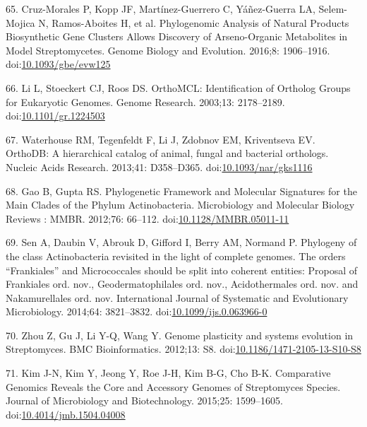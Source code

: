 \documentclass[12pt,twoside]{reedthesis}
\begin{document}
  \hypertarget{ref-cruz-moralesux5fphylogenomicux5f2016}{}
  65. Cruz-Morales P, Kopp JF, Martínez-Guerrero C, Yáñez-Guerra LA,
  Selem-Mojica N, Ramos-Aboites H, et al. Phylogenomic Analysis of Natural
  Products Biosynthetic Gene Clusters Allows Discovery of Arseno-Organic
  Metabolites in Model Streptomycetes. Genome Biology and Evolution.
  2016;8: 1906--1916.
  doi:\href{https://doi.org/10.1093/gbe/evw125}{10.1093/gbe/evw125}
  
  \hypertarget{ref-liux5forthomclux5f2003}{}
  66. Li L, Stoeckert CJ, Roos DS. OrthoMCL: Identification of Ortholog
  Groups for Eukaryotic Genomes. Genome Research. 2003;13: 2178--2189.
  doi:\href{https://doi.org/10.1101/gr.1224503}{10.1101/gr.1224503}
  
  \hypertarget{ref-waterhouseux5forthodbux5f2013}{}
  67. Waterhouse RM, Tegenfeldt F, Li J, Zdobnov EM, Kriventseva EV.
  OrthoDB: A hierarchical catalog of animal, fungal and bacterial
  orthologs. Nucleic Acids Research. 2013;41: D358--D365.
  doi:\href{https://doi.org/10.1093/nar/gks1116}{10.1093/nar/gks1116}
  
  \hypertarget{ref-gaoux5fphylogeneticux5f2012}{}
  68. Gao B, Gupta RS. Phylogenetic Framework and Molecular Signatures for
  the Main Clades of the Phylum Actinobacteria. Microbiology and Molecular
  Biology Reviews : MMBR. 2012;76: 66--112.
  doi:\href{https://doi.org/10.1128/MMBR.05011-11}{10.1128/MMBR.05011-11}
  
  \hypertarget{ref-senux5fphylogenyux5f2014}{}
  69. Sen A, Daubin V, Abrouk D, Gifford I, Berry AM, Normand P. Phylogeny
  of the class Actinobacteria revisited in the light of complete genomes.
  The orders ``Frankiales'' and Micrococcales should be split into
  coherent entities: Proposal of Frankiales ord. nov., Geodermatophilales
  ord. nov., Acidothermales ord. nov. and Nakamurellales ord. nov.
  International Journal of Systematic and Evolutionary Microbiology.
  2014;64: 3821--3832.
  doi:\href{https://doi.org/10.1099/ijs.0.063966-0}{10.1099/ijs.0.063966-0}
  
  \hypertarget{ref-zhouux5fgenomeux5f2012}{}
  70. Zhou Z, Gu J, Li Y-Q, Wang Y. Genome plasticity and systems
  evolution in Streptomyces. BMC Bioinformatics. 2012;13: S8.
  doi:\href{https://doi.org/10.1186/1471-2105-13-S10-S8}{10.1186/1471-2105-13-S10-S8}
  
  \hypertarget{ref-kimux5fcomparativeux5f2015}{}
  71. Kim J-N, Kim Y, Jeong Y, Roe J-H, Kim B-G, Cho B-K. Comparative
  Genomics Reveals the Core and Accessory Genomes of Streptomyces Species.
  Journal of Microbiology and Biotechnology. 2015;25: 1599--1605.
  doi:\href{https://doi.org/10.4014/jmb.1504.04008}{10.4014/jmb.1504.04008}
  
\end{document}
